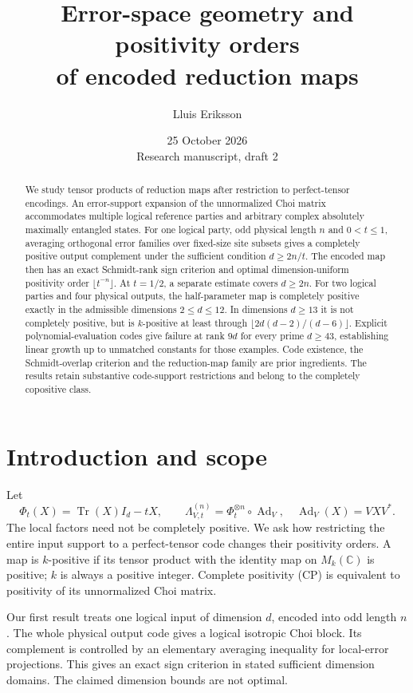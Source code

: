 \documentclass[11pt,a4paper]{article}
\title{Error-space geometry and positivity orders\\of encoded reduction maps}
\author{Lluis Eriksson}
\date{25 October 2026\\\small Research manuscript, draft 2}
\newcommand{\Tr}{\operatorname{Tr}}
\newcommand{\C}{\mathbb C}
\begin{document}
\maketitle
\begin{abstract}
We study tensor products of reduction maps after restriction to perfect-tensor encodings. An error-support expansion of the unnormalized Choi matrix accommodates multiple logical reference parties and arbitrary complex absolutely maximally entangled states. For one logical party, odd physical length \(n\) and \(0<t\le1\), averaging orthogonal error families over fixed-size site subsets gives a completely positive output complement under the sufficient condition \(d\ge2n/t\). The encoded map then has an exact Schmidt-rank sign criterion and optimal dimension-uniform positivity order \(\lfloor t^{-n}\rfloor\). At \(t=1/2\), a separate estimate covers \(d\ge2n\). For two logical parties and four physical outputs, the half-parameter map is completely positive exactly in the admissible dimensions \(2\le d\le12\). In dimensions \(d\ge13\) it is not completely positive, but is \(k\)-positive at least through \(\lfloor2d(d-2)/(d-6)\rfloor\). Explicit polynomial-evaluation codes give failure at rank \(9d\) for every prime \(d\ge43\), establishing linear growth up to unmatched constants for those examples. Code existence, the Schmidt-overlap criterion and the reduction-map family are prior ingredients. The results retain substantive code-support restrictions and belong to the completely copositive class.
\end{abstract}

\section{Introduction and scope}
Let
\[
 \Phi_t(X)=\Tr(X)I_d-tX,\qquad
 \Lambda_{V,t}^{(n)}=\Phi_t^{\otimes n}\circ\operatorname{Ad}_V,
 \quad \operatorname{Ad}_V(X)=VXV^*.
\]
The local factors need not be completely positive. We ask how restricting the entire input support to a perfect-tensor code changes their positivity orders. A map is \(k\)-positive if its tensor product with the identity map on \(M_k(\C)\) is positive; \(k\) is always a positive integer. Complete positivity (CP) is equivalent to positivity of its unnormalized Choi matrix.

Our first result treats one logical input of dimension \(d\), encoded into odd length \(n\). The whole physical output code gives a logical isotropic Choi block. Its complement is controlled by an elementary averaging inequality for local-error projections. This gives an exact sign criterion in stated sufficient dimension domains. The claimed dimension bounds are not optimal.
\end{document}
